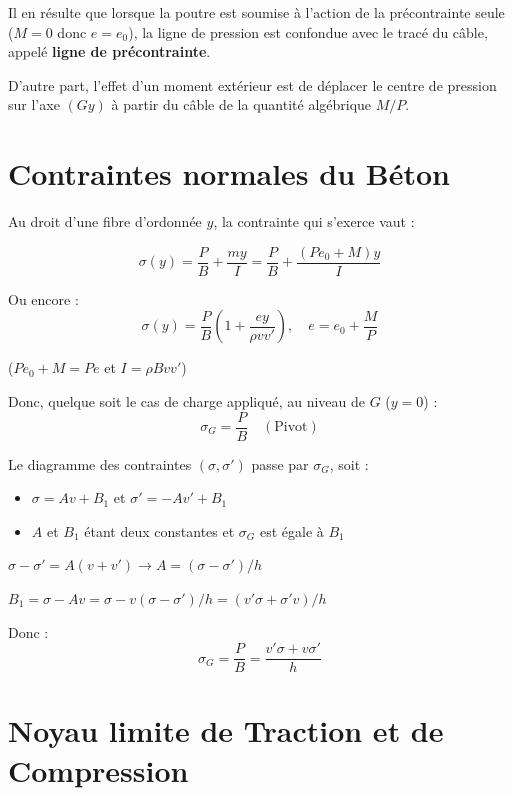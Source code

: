 \documentclass[12pt,a4paper]{article}
\begin{document}
Il en résulte que lorsque la poutre est soumise à l'action de la précontrainte seule ($M=0$ donc $e=e_0$), la ligne de pression est confondue avec le tracé du câble, appelé \textbf{ligne de précontrainte}.

D'autre part, l'effet d'un moment extérieur est de déplacer le centre de pression sur l'axe $(Gy)$ à partir du câble de la quantité algébrique $M/P$.

\section{Contraintes normales du Béton}

Au droit d'une fibre d'ordonnée $y$, la contrainte qui s'exerce vaut :

\begin{equation}
\sigma(y) = \frac{P}{B} + \frac{my}{I} = \frac{P}{B} + \frac{(Pe_0 + M)y}{I}
\end{equation}

Ou encore :
\begin{equation}
\sigma(y) = \frac{P}{B} \left( 1 + \frac{ey}{\rho vv'} \right), \quad e = e_0 + \frac{M}{P}
\end{equation}

($Pe_0 + M = Pe$ et $I = \rho Bvv'$)

Donc, quelque soit le cas de charge appliqué, au niveau de $G$ ($y=0$) :
\begin{equation}
\sigma_G = \frac{P}{B} \quad (\text{Pivot})
\end{equation}

Le diagramme des contraintes $(\sigma, \sigma')$ passe par $\sigma_G$, soit :
\begin{itemize}
    \item $\sigma = Av + B_1$ et $\sigma' = -Av' + B_1$
    \item $A$ et $B_1$ étant deux constantes et $\sigma_G$ est égale à $B_1$
\end{itemize}

$\sigma - \sigma' = A(v+v') \rightarrow A = (\sigma - \sigma')/h$

$B_1 = \sigma - Av = \sigma - v(\sigma - \sigma')/h = (v'\sigma + \sigma'v)/h$

Donc :
\begin{equation}
\sigma_G = \frac{P}{B} = \frac{v'\sigma + v\sigma'}{h}
\end{equation}

\section{Noyau limite de Traction et de Compression}
\end{document}
